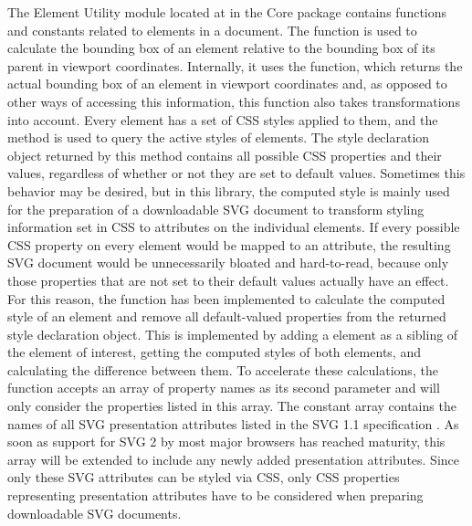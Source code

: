 The Element Utility module located at
 in the Core package contains
functions and constants related to elements in a document. The
 function is used to calculate the
bounding box of an element relative to the bounding box of its parent
in viewport coordinates. Internally, it uses the
 function, which returns the actual
bounding box of an element in viewport coordinates and, as opposed to
other ways of accessing this information, this function also takes
transformations into account. Every element has a set of CSS styles
applied to them, and the  method is used
to query the active styles of elements. The style declaration object
returned by this method contains all possible CSS properties and their
values, regardless of whether or not they are set to default values.
Sometimes this behavior may be desired, but in this library, the
computed style is mainly used for the preparation of a downloadable
SVG document to transform styling information set in CSS to attributes
on the individual elements. If every possible CSS property on every
element would be mapped to an attribute, the resulting SVG document
would be unnecessarily bloated and hard-to-read, because only those
properties that are not set to their default values actually have an
effect. For this reason, the
 function has been
implemented to calculate the computed style of an element and remove
all default-valued properties from the returned style declaration
object. This is implemented by adding a  element
as a sibling of the element of interest, getting the computed styles
of both elements, and calculating the difference between them. To
accelerate these calculations, the
 function accepts an array
of property names as its second parameter and will only consider the
properties listed in this array. The constant
 array contains the names of all SVG
presentation attributes listed in the SVG 1.1 specification
\parencite{SVG11}. As soon as support for SVG 2 \parencite{SVG2} by
most major browsers has reached maturity, this array will be extended
to include any newly added presentation attributes. Since only these
SVG attributes can be styled via CSS, only CSS properties representing
presentation attributes have to be considered when preparing
downloadable SVG documents.

